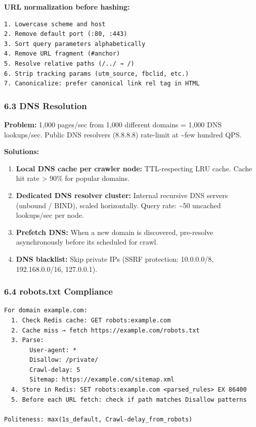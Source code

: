 \documentclass[11pt]{article}
\providecommand{\tightlist}{\setlength{\itemsep}{1pt}\setlength{\parskip}{0pt}}
\begin{document}
\textbf{URL normalization before hashing:}

\setcodelang{}

\begin{verbatim}
1. Lowercase scheme and host
2. Remove default port (:80, :443)
3. Sort query parameters alphabetically
4. Remove URL fragment (#anchor)
5. Resolve relative paths (/../ → /)
6. Strip tracking params (utm_source, fbclid, etc.)
7. Canonicalize: prefer canonical link rel tag in HTML
\end{verbatim}

\subsubsection{6.3 DNS Resolution}\label{63-dns-resolution}

\textbf{Problem:} 1,000 pages/sec from 1,000 different domains = 1,000 DNS lookups/sec. Public DNS resolvers (8.8.8.8) rate-limit at \textasciitilde few hundred QPS.

\textbf{Solutions:}

\begin{enumerate}
\def\labelenumi{\arabic{enumi}.}
\tightlist
\item
  \textbf{Local DNS cache per crawler node:} TTL-respecting LRU cache. Cache hit rate \textgreater{} 90\% for popular domains.
\item
  \textbf{Dedicated DNS resolver cluster:} Internal recursive DNS servers (unbound / BIND), scaled horizontally. Query rate: \textasciitilde50 uncached lookups/sec per node.
\item
  \textbf{Prefetch DNS:} When a new domain is discovered, pre-resolve asynchronously before it\textquotesingle s scheduled for crawl.
\item
  \textbf{DNS blacklist:} Skip private IPs (SSRF protection: 10.0.0.0/8, 192.168.0.0/16, 127.0.0.1).
\end{enumerate}

\subsubsection{6.4 robots.txt Compliance}\label{64-robotstxt-compliance}

\setcodelang{}

\begin{verbatim}
For domain example.com:
  1. Check Redis cache: GET robots:example.com
  2. Cache miss → fetch https://example.com/robots.txt
  3. Parse:
       User-agent: *
       Disallow: /private/
       Crawl-delay: 5
       Sitemap: https://example.com/sitemap.xml
  4. Store in Redis: SET robots:example.com <parsed_rules> EX 86400
  5. Before each URL fetch: check if path matches Disallow patterns

Politeness: max(1s_default, Crawl-delay_from_robots)
\end{verbatim}
\end{document}
